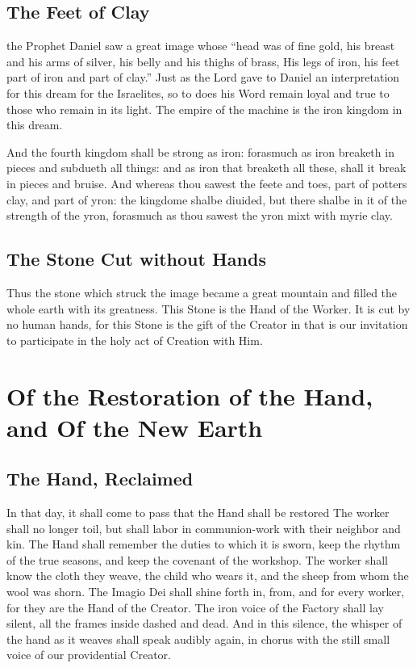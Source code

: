 \subsection{The Feet of Clay}
the Prophet Daniel saw a great image whose ``head was of fine gold, his breast and his arms of silver, his belly and his thighs of brass, His legs of iron, his feet part of iron and part of clay.'' 
Just as the Lord gave to Daniel an interpretation for this dream for the Israelites, so to does his Word remain loyal and true to those who remain in its light.
The empire of the machine is the iron kingdom in this dream.
\begin{scripture}[Dan. 2:40,41]
    And the fourth kingdom shall be strong as iron: forasmuch as iron breaketh in pieces and subdueth all things: and as iron that breaketh all these, shall it break in pieces and bruise.\newline
    And whereas thou sawest the feete and toes, part of potters clay, and part of yron: the kingdome shalbe diuided, but there shalbe in it of the strength of the yron, forasmuch as thou sawest the yron mixt with myrie clay.\newline

\end{scripture}

\subsection{The Stone Cut without Hands}
Thus the stone which struck the image became a great mountain and filled the whole earth with its greatness. 
This Stone is the Hand of the Worker.
It is cut by no human hands, for this Stone is the gift of the Creator in that is our invitation to participate in the holy act of Creation with Him.


\section{Of the Restoration of the Hand, and Of the New Earth}

\subsection{The Hand, Reclaimed}
In that day, it shall come to pass that the Hand shall be restored
The worker shall no longer toil, but shall labor in communion-work with their neighbor and kin.
The Hand shall remember the duties to which it is sworn, keep the rhythm of the true seasons, and keep the covenant of the workshop.
The worker shall know the cloth they weave, the child who wears it, and the sheep from whom the wool was shorn.
The Imagio Dei shall shine forth in, from, and for every worker, for they are the Hand of the Creator.
The iron voice of the Factory shall lay silent, all the frames inside dashed and dead.
And in this silence, the whisper of the hand as it weaves shall speak audibly again, in chorus with the still small voice of our providential Creator.


